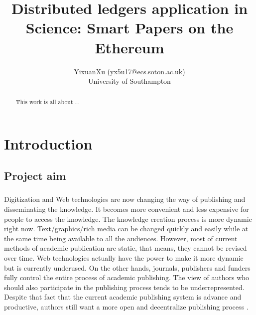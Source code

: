 \documentclass [12pt]{report}
\title{Distributed ledgers application in Science: Smart
Papers on the Ethereum}
\author{YixuanXu (yx5u17@ecs.soton.ac.uk)\\University of Southampton}
\begin{document}
\maketitle
\newpage
\tableofcontents
\newpage
\listoffigures
\newpage
\listoftables
\newpage
\begin{abstract}
	This work is all about \dots
\end{abstract}
\newpage
\chapter{Introduction}
\section{Project aim}
\paragraph{}Digitization and Web technologies are now changing the way of publishing and disseminating the knowledge.
It becomes more convenient and less expensive for people to access the knowledge. 
The knowledge creation process is more dynamic right now. 
Text/graphics/rich media can be changed quickly and easily while at the same time being available to all the audiences.
However, most of current methods of academic publication are static, that means, they cannot be revised over time\cite{heller2014dynamic}. 
Web technologies actually have the power to make it more dynamic but is currently underused. On the other hands, journals, publishers and funders fully control
the entire process of academic publishing. The view of authors who should also participate in the publishing process tends to be underrepresented. 
Despite that fact that the current academic publishing system is advance and productive, 
authors still want a more open and decentralize publishing process \cite{d2018authors}.
\end{document}
